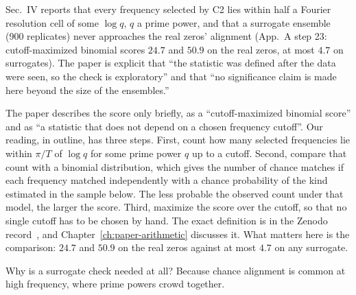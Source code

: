 Sec.~IV reports that every frequency selected by C2 lies within half a Fourier resolution cell of some $\log q$, $q$ a prime power, and that a surrogate ensemble (900 replicates) never approaches the real zeros' alignment (App.~A step 23: cutoff-maximized binomial scores $24.7$ and $50.9$ on the real zeros, at most $4.7$ on surrogates). The paper is explicit that ``the statistic was defined after the data were seen, so the check is exploratory'' and that ``no significance claim is made here beyond the size of the ensembles.''

The paper describes the score only briefly, as a ``cutoff-maximized binomial score'' and as ``a statistic that does not depend on a chosen frequency cutoff''. Our reading, in outline, has three steps. First, count how many selected frequencies lie within $\pi/T$ of $\log q$ for some prime power $q$ up to a cutoff. Second, compare that count with a binomial distribution, which gives the number of chance matches if each frequency matched independently with a chance probability of the kind estimated in the sample below. The less probable the observed count under that model, the larger the score. Third, maximize the score over the cutoff, so that no single cutoff has to be chosen by hand. The exact definition is in the Zenodo record~\cite{zenodo}, and Chapter~\ref{ch:paper-arithmetic} discusses it. What matters here is the comparison: $24.7$ and $50.9$ on the real zeros against at most $4.7$ on any surrogate.

Why is a surrogate check needed at all? Because chance alignment is common at high frequency, where prime powers crowd together.

